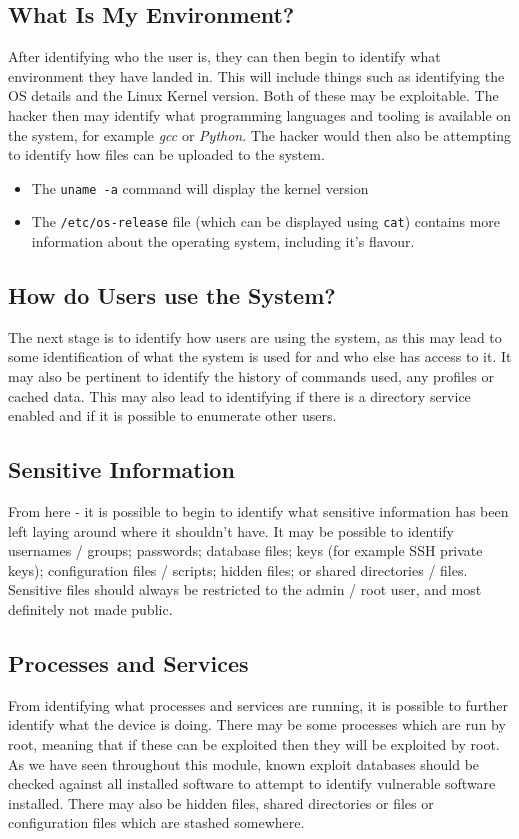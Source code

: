 \subsection{What Is My Environment?}
After identifying who the user is, they can then begin to identify what environment they have landed in. This will include things such as identifying the OS details and the Linux Kernel version. Both of these may be exploitable. The hacker then may identify what programming languages and tooling is available on the system, for example \textit{gcc} or \textit{Python}. The hacker would then also be attempting to identify how files can be uploaded to the system.
\begin{itemize}
    \item The \verb|uname -a| command will display the kernel version
    \item The \verb|/etc/os-release| file (which can be displayed using \verb|cat|) contains more information about the operating system, including it's flavour.
\end{itemize}

\subsection{How do Users use the System?}
The next stage is to identify how users are using the system, as this may lead to some identification of what the system is used for and who else has access to it. It may also be pertinent to identify the history of commands used, any profiles or cached data. This may also lead to identifying if there is a directory service enabled and if it is possible to enumerate other users. 

\subsection{Sensitive Information}
From here - it is possible to begin to identify what sensitive information has been left laying around where it shouldn't have. It may be possible to identify usernames / groups; passwords; database files; keys (for example SSH private keys); configuration files / scripts; hidden files; or shared directories / files.\\

Sensitive files should always be restricted to the admin / root user, and most definitely not made public.

\subsection{Processes and Services}
From identifying what processes and services are running, it is possible to further identify what the device is doing. There may be some processes which are run by root, meaning that if these can be exploited then they will be exploited by root. As we have seen throughout this module, known exploit databases should be checked against all installed software to attempt to identify vulnerable software installed. There may also be hidden files, shared directories or files or configuration files which are stashed somewhere.

